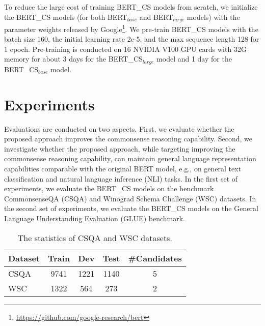 \documentclass[11pt,a4paper]{article}
\begin{document}
To reduce the large cost of training BERT\_CS models from scratch, we initialize the BERT\_CS models (for both BERT$_{base}$ and BERT$_{large}$ models) with the parameter weights released by Google\footnote{\url{https://github.com/google-research/bert}}.
We pre-train BERT\_CS models with the batch size 160, the initial learning rate 2e-5, and the max sequence length 128 for 1 epoch. Pre-training is conducted on 16 NVIDIA V100 GPU cards with 32G memory for about 3 days for the BERT\_CS$_{large}$ model and 1 day for the BERT\_CS$_{base}$ model.

\section{Experiments}
\label{sect:expts}
Evaluations are conducted on two aspects. First, we evaluate whether the proposed approach improves the commonsense reasoning capability. Second, we investigate whether the proposed approach, while targeting improving the commonsense reasoning capability, can maintain general language representation capabilities comparable with the original BERT model, e.g., on general text classification and natural language inference (NLI) tasks. 
In the first set of experiments, we evaluate the BERT\_CS models on the benchmark CommonsenseQA (CSQA) and Winograd Schema Challenge (WSC) datasets. In the second set of experiments, we evaluate the BERT\_CS models on the General Language Understanding Evaluation (GLUE) benchmark.

\begin{table}[t!]
	\begin{center}
		\small
		\begin{tabular}{p{1.2cm}|c|c|c|c}
			\toprule
			\textbf{Dataset}             & \textbf{Train} & \textbf{Dev} & \textbf{Test} & \textbf{\#Candidates} \\
			\midrule
			CSQA       & 9741    & 1221  & 1140  & 5  \\ 
			\midrule
			WSC        & 1322    &  564  & 273   & 2  \\
			\bottomrule
		\end{tabular}
	\end{center}
	\caption{The statistics of CSQA and WSC datasets.}
	\label{dataset}
\end{table}
\end{document}
